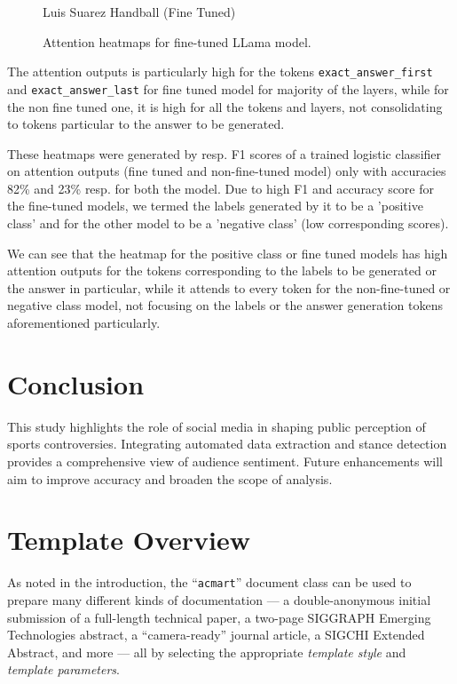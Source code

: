 \documentclass[sigconf, review]{acmart}
\begin{document}
\begin{enumerate}
\begin{figure}[ht]
\begin{minipage}{0.35\textwidth}
             \caption{\footnotesize Luis Suarez Handball (Fine Tuned)}
             \label{fig:suarez-positive-probing}
         \end{minipage}
         \caption{\footnotesize Attention heatmaps for fine-tuned LLama model.}
         \label{fig:positive-class-heatmaps}
     \end{figure}

     The attention outputs is particularly high for the tokens \texttt{exact\_answer\_first} and \texttt{exact\_answer\_last} for fine tuned model for majority of the layers, while for the non fine tuned one, it is high for all the tokens and layers, not consolidating to tokens particular to the answer to be generated.
     
     These heatmaps were generated by resp. F1 scores of a trained logistic classifier on attention outputs (fine tuned and non-fine-tuned model) only with accuracies 82\% and 23\% resp. for both the model.
     Due to high F1 and accuracy score for the fine-tuned models, we termed the labels generated by it to be a 'positive class' and for the other model to be a 'negative class' (low corresponding scores).
     
     We can see that the heatmap for the positive class or fine tuned models has high attention outputs for the tokens corresponding to the labels to be generated or the answer in particular, while it attends to every token for the non-fine-tuned or negative class model, not focusing on the labels or the answer generation tokens aforementioned particularly.
    
\end{enumerate}

\section{Conclusion}
This study highlights the role of social media in shaping public perception of sports controversies. Integrating automated data extraction and stance detection provides a comprehensive view of audience sentiment. Future enhancements will aim to improve accuracy and broaden the scope of analysis.



\section{Template Overview}
As noted in the introduction, the ``\verb|acmart|'' document class can
be used to prepare many different kinds of documentation --- a
double-anonymous initial submission of a full-length technical paper, a
two-page SIGGRAPH Emerging Technologies abstract, a ``camera-ready''
journal article, a SIGCHI Extended Abstract, and more --- all by
selecting the appropriate {\itshape template style} and {\itshape
  template parameters}.
\end{document}
